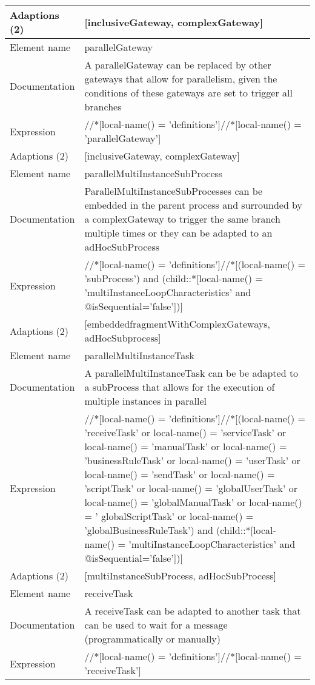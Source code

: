 \begin{center}
\begin{tiny}
\begin{longtable}{p{}|p{}}
\myrowcolour
Adaptions (2) & [inclusiveGateway, complexGateway]\\
\midrule
Element name & parallelGateway\\
\myrowcolour
Documentation &A parallelGateway can be replaced by other gateways that allow for parallelism, given the conditions of these gateways are set to trigger all branches\\
Expression & //*[local-name() = 'definitions']//*[local-name() = 'parallelGateway']\\
\myrowcolour
Adaptions (2) & [inclusiveGateway, complexGateway]\\
\midrule
Element name & parallelMultiInstanceSubProcess\\
\myrowcolour
Documentation &ParallelMultiInstanceSubProcesses can be embedded in the parent process and surrounded by a complexGateway to trigger the same branch multiple times or they can be adapted to an adHocSubProcess\\
Expression & //*[local-name() = 'definitions']//*[(local-name() = 'subProcess') and (child::*[local-name() = 'multiInstanceLoopCharacteristics' and @isSequential='false'])]\\
\myrowcolour
Adaptions (2) & [embeddedfragmentWithComplexGateways, adHocSubprocess]\\
\midrule
Element name & parallelMultiInstanceTask\\
\myrowcolour
Documentation &A parallelMultiInstanceTask can be be adapted to a subProcess that allows for the execution of multiple instances in parallel\\
Expression & //*[local-name() = 'definitions']//*[(local-name() = 'receiveTask' or local-name() = 'serviceTask' or local-name() = 'manualTask' or local-name() = 'businessRuleTask' or local-name() = 'userTask' or local-name() = 'sendTask' or local-name() = 'scriptTask'  or local-name() = 'globalUserTask' or local-name() = 'globalManualTask' or local-name() = ' globalScriptTask' or local-name() = 'globalBusinessRuleTask') and (child::*[local-name() = 'multiInstanceLoopCharacteristics' and @isSequential='false'])]\\
\myrowcolour
Adaptions (2) & [multiInstanceSubProcess, adHocSubProcess]\\
\midrule
Element name & receiveTask\\
\myrowcolour
Documentation &A receiveTask can be adapted to another task that can be used to wait for a message (programmatically or manually)\\
Expression & //*[local-name() = 'definitions']//*[local-name() = 'receiveTask']\\

\end{longtable}
\end{tiny}
\end{center}

